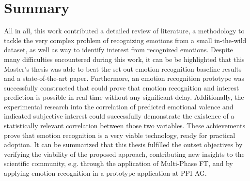 \section{Summary}
All in all, this work contributed a detailed review of literature, a methodology to tackle the very complex problem of recognizing emotions from a small in-the-wild dataset, as well as way to identify interest from recognized emotions. Despite many difficulties encountered during this work, it can be be highlighted that this Master's thesis was able to beat the set out emotion recognition baseline results and a state-of-the-art paper. 
\newline\newline
Furthermore, an emotion recognition prototype was successfully constructed that could prove that emotion recognition and interest prediction is possible in real-time without any significant delay. Additionally, the experimental research into the correlation of predicted emotional valence and indicated subjective interest could successfully demonstrate the existence of a statistically relevant correlation between those two variables. These achievements prove that emotion recognition is a very viable technology, ready for practical adoption.
\newline\newline
It can be summarized that this thesis fulfilled the outset objectives by verifying the viability of the proposed approach, contributing new insights to the scientific community, e.g. through the application of Multi-Phase FT, and by applying emotion recognition in a prototype application at PPI AG.